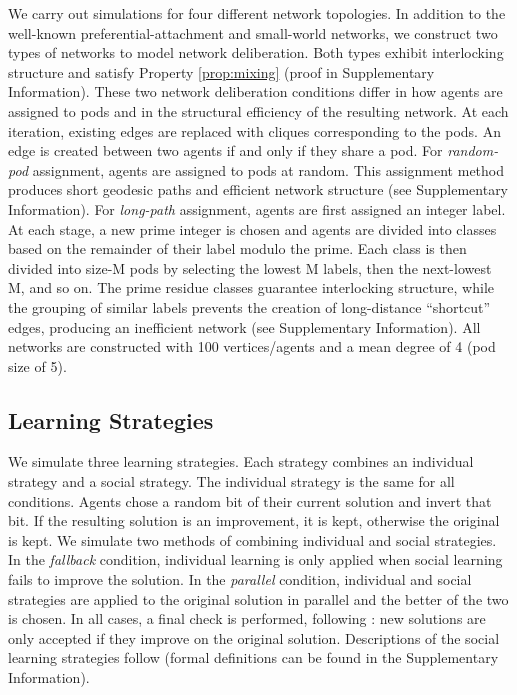 \documentclass[twocolumn,10pt]{article}
\begin{document}
We carry out simulations for four different network topologies. In addition to the well-known preferential-attachment \cite{barabasi_emergence_1999} and small-world \cite{watts_collective_1998} networks, we construct two types of networks to model network deliberation.
Both types exhibit interlocking structure and satisfy Property \ref{prop:mixing} (proof in Supplementary Information).
These two network deliberation conditions differ in how agents are assigned to pods and in the structural efficiency of the resulting network.
At each iteration, existing edges are replaced with cliques corresponding to the pods. An edge is created between two agents if and only if they share a pod.
For {\em random-pod} assignment, agents are assigned to pods at random.
This assignment method produces short geodesic paths and efficient network structure (see Supplementary Information).
For {\em long-path} assignment, agents are first assigned an integer label. At each stage, a new prime integer is chosen and agents are divided into classes based on the remainder of their label modulo the prime.
Each class is then divided into size-M pods by selecting the lowest M labels, then the next-lowest M, and so on.
The prime residue classes guarantee interlocking structure, while the grouping of similar labels prevents the creation of long-distance ``shortcut'' edges, producing an inefficient network (see Supplementary Information).
All networks are constructed with 100 vertices/agents and a mean degree of 4 (pod size of 5).

\subsection{Learning Strategies}
We simulate three learning strategies. Each strategy combines an individual strategy and a social strategy. The individual strategy is the same for all conditions. Agents chose a random bit of their current solution and invert that bit. If the resulting solution is an improvement, it is kept, otherwise the original is kept.
We simulate two methods of combining individual and social strategies. In the {\em fallback} condition, individual learning is only applied when social learning fails to improve the solution.
In the {\em parallel} condition, individual and social strategies are applied to the original solution in parallel and the better of the two is chosen. In all cases, a final check is performed, following \cite{barkoczi_social_2016}: new solutions are only accepted if they improve on the original solution. Descriptions of the social learning strategies follow (formal definitions can be found in the Supplementary Information).
\end{document}
